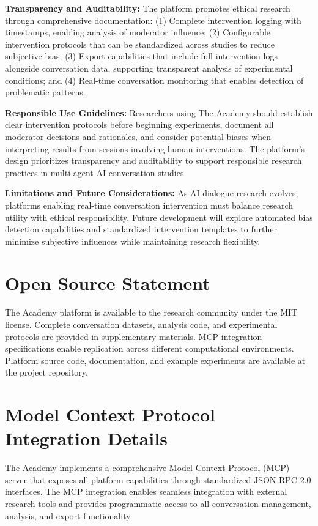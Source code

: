 \documentclass[11pt,letterpaper]{article}
\newcommand{\theacademy}{The Academy}
\newcommand{\mcp}{MCP}
\begin{document}
\textbf{Transparency and Auditability:} The platform promotes ethical research through comprehensive documentation: (1) Complete intervention logging with timestamps, enabling analysis of moderator influence; (2) Configurable intervention protocols that can be standardized across studies to reduce subjective bias; (3) Export capabilities that include full intervention logs alongside conversation data, supporting transparent analysis of experimental conditions; and (4) Real-time conversation monitoring that enables detection of problematic patterns.

\textbf{Responsible Use Guidelines:} Researchers using The Academy should establish clear intervention protocols before beginning experiments, document all moderator decisions and rationales, and consider potential biases when interpreting results from sessions involving human interventions. The platform's design prioritizes transparency and auditability to support responsible research practices in multi-agent AI conversation studies.

\textbf{Limitations and Future Considerations:} As AI dialogue research evolves, platforms enabling real-time conversation intervention must balance research utility with ethical responsibility. Future development will explore automated bias detection capabilities and standardized intervention templates to further minimize subjective influences while maintaining research flexibility.
\section*{Open Source Statement}

\theacademy{} platform is available to the research community under the MIT license. Complete conversation datasets, analysis code, and experimental protocols are provided in supplementary materials. \mcp{} integration specifications enable replication across different computational environments. Platform source code, documentation, and example experiments are available at the project repository.




\appendix

\section{Model Context Protocol Integration Details}
\label{app:mcp}

\theacademy{} implements a comprehensive Model Context Protocol (MCP) server that exposes all platform capabilities through standardized JSON-RPC 2.0 interfaces. The MCP integration enables seamless integration with external research tools and provides programmatic access to all conversation management, analysis, and export functionality.
\end{document}
